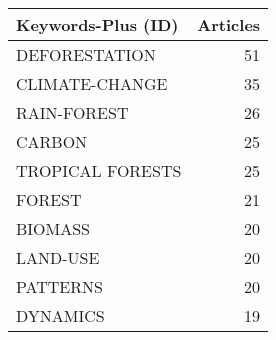 
\begin{tabular}{lr}
\toprule
Keywords-Plus (ID) & Articles\\
\midrule
DEFORESTATION & 51\\
CLIMATE-CHANGE & 35\\
RAIN-FOREST & 26\\
CARBON & 25\\
TROPICAL FORESTS & 25\\
\addlinespace
FOREST & 21\\
BIOMASS & 20\\
LAND-USE & 20\\
PATTERNS & 20\\
DYNAMICS & 19\\
\bottomrule
\end{tabular}